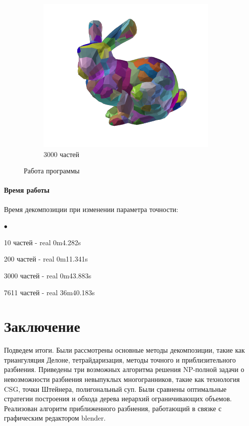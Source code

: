 \documentclass[11pt,a4paper]{extarticle}
\newenvironment{compactlist}{
\begin{list}{{$\bullet$}}{
\setlength\partopsep{0pt}
\setlength\parskip{0pt}
\setlength\parsep{0pt}
\setlength\topsep{0pt}
\setlength\itemsep{0pt}
}}{
\end{list}
}
\begin{document}
\begin{figure}[ht]
\begin{subfigure}{2in}
			\end{subfigure}
			\begin{subfigure}{2in}
				\includegraphics[width=\textwidth]{bunny_hacd3000}					
				\caption{3000 частей}
				\label{bunny3}
		\end{subfigure}
			\caption{Работа программы}
			\label{bunny}
		\end{figure}

		\paragraph{Время работы}
		Время декомпозиции при изменении параметра точности:
		\begin{compactlist}
			\item 10 частей - real 0m4.282s
			\item 200 частей - real 0m11.341s
			\item 3000 частей - real 0m43.883s
			\item 7611 частей - real 36m40.183s
		\end{compactlist}
	\section{Заключение}
		Подведем итоги.
		Были рассмотрены основные методы декомпозиции, такие как триангуляция Делоне, тетрайдаризация, методы точного и приблизительного разбиения.
		Приведены три возможных алгоритма решения NP-полной задачи о невозможности разбиения невыпуклых многогранников, такие как технология CSG, точки Штейнера, полигональный суп.
		Были сравнены оптимальные стратегии построения и обхода дерева иерархий ограничивающих объемов.
		Реализован алгоритм приближенного разбиения, работающий в связке с графическим редактором blender.
		
\end{document}
